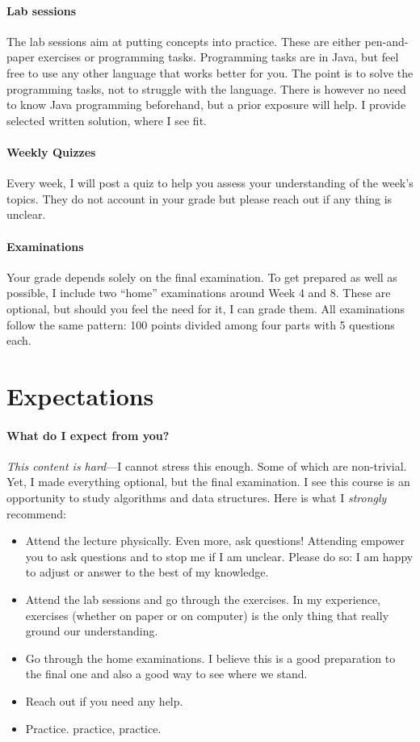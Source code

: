 \documentclass{aldast}
\begin{document}
\paragraph {Lab sessions}
The lab sessions aim at putting concepts into practice. These are
either pen-and-paper exercises or programming tasks. Programming tasks
are in Java, but feel free to use any other language that works better
for you. The point is to solve the programming tasks, not to struggle
with the language. There is however no need to know Java programming
beforehand, but a prior exposure will help. I provide selected written
solution, where I see fit.

\paragraph {Weekly Quizzes}
Every week, I will post a quiz to help you assess your understanding
of the week's topics. They do not account in your grade but please
reach out if any thing is unclear.

\paragraph{Examinations}
Your grade depends solely on the final examination. To get prepared as
well as possible, I include two ``home'' examinations around Week 4 and
8. These are optional, but should you feel the need for it, I can
grade them. All examinations follow the same pattern: 100 points
divided among four parts with 5 questions each.

\section{Expectations}

\paragraph{What do I expect from you?}

\emph{This content is hard}---I cannot stress this enough. Some of
which are non-trivial. Yet, I made everything optional, but the final
examination. I see this course is an opportunity to study algorithms
and data structures. Here is what I \emph{strongly} recommend:

\begin{itemize}
\item Attend the lecture physically. Even more, ask questions!
  Attending empower you to ask questions and to stop me if I am
  unclear. Please do so: I am happy to adjust or answer to the best of
  my knowledge.
\item Attend the lab sessions and go through the exercises. In my
  experience, exercises (whether on paper or on computer) is the only
  thing that really ground our understanding.
\item Go through the home examinations. I believe this is a good
  preparation to the final one and also a good way to see where we
  stand.
\item Reach out if you need any help.
\item Practice. practice, practice.
\end{itemize}
\end{document}
